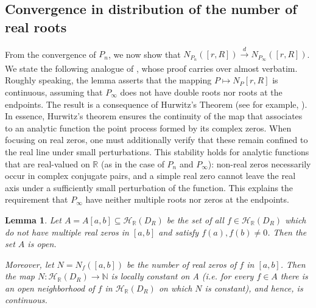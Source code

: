 \documentclass[12pt, reqno]{amsart}
\theoremstyle{plain}
\newtheorem{lemma}[theorem]{Lemma}
\theoremstyle{definition}
\newcommand\N{{\mathbb{N}}}
\newcommand\R{{\mathbb{R}}}
\begin{document}
\subsection{Convergence in distribution of the number of real roots}\label{sec:distribution}
From the convergence of $P_n$, we now show that $N_{P_{n}}([r, R]) \xrightarrow[]{d} N_{P_{\infty}}([r, R])$. We state the following analogue of \cite[Lemma 4.1]{Iksanov2016}, whose proof carries over almost verbatim. Roughly speaking, the lemma asserts that the mapping $P \mapsto N_{P}[r, R]$ is continuous, assuming that $P_{\infty}$ does not have double roots nor roots at the endpoints.   The result is a consequence of Hurwitz's Theorem (see for example, \cite[Page 152]{conway2012functions}). In essence, Hurwitz’s theorem ensures the continuity of the map that associates to an analytic function the point process formed by its complex zeros. 
When focusing on real zeros, one must additionally verify that these remain confined to the real line under small perturbations. 
This stability holds for analytic functions that are real-valued on $\mathbb{R}$ (as in the case of $P_n$ and $P_{\infty}$): non-real zeros necessarily occur in complex conjugate pairs, and a simple real zero cannot leave the real axis under a sufficiently small perturbation of the function. This explains the requirement that $P_{\infty}$ have neither multiple roots nor zeros at the endpoints.
\begin{lemma}\label{lem:IksanovLemma41}
	Let $A = A[a, b] \subseteq \mathcal H_{\mathbb{R}}(D_R)$ be the set of all $f \in \mathcal H_{\R}(D_R)$ which do not have multiple real zeros in $[a, b]$ and satisfy $f(a),f(b) \neq 0$. Then the set $A$ is open.
	
	Moreover, let $N = N_f([a, b])$ be the number of real zeros of $f$ in $[a, b]$. Then the map $N: \mathcal H_{\R}(D_R) \rightarrow \N$ is locally constant on A (i.e. for every $f \in A$ there is an open neighborhood of $f$ in $\mathcal H_{\R}(D_R)$ on which $N$ is constant), and hence, is continuous.
\end{lemma}
\end{document}
